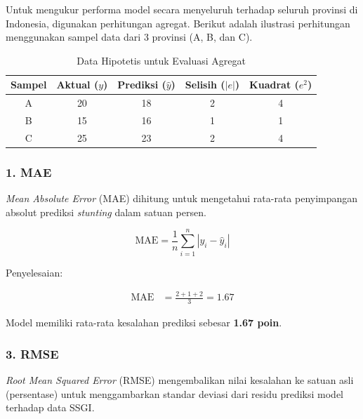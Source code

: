 Untuk mengukur performa model secara menyeluruh terhadap seluruh provinsi di Indonesia, digunakan perhitungan agregat. Berikut adalah ilustrasi perhitungan menggunakan sampel data dari 3 provinsi (A, B, dan C).

\begin{table}[H]
    \centering
    \renewcommand{\arraystretch}{1.3}
    \caption{Data Hipotetis untuk Evaluasi Agregat}
    \label{tab:eval_metrics_dummy}
    \begin{tabular}{ccccc}
    \toprule
    \textbf{Sampel} & \textbf{Aktual ($y$)} & \textbf{Prediksi ($\hat{y}$)} & \textbf{Selisih ($|e|$)} & \textbf{Kuadrat ($e^2$)} \\
    \midrule
    A & 20 & 18 & 2 & 4 \\
    B & 15 & 16 & 1 & 1 \\
    C & 25 & 23 & 2 & 4 \\
    \bottomrule
    \end{tabular}
\end{table}

\subsubsection*{1. MAE}
\textit{Mean Absolute Error} (MAE) dihitung untuk mengetahui rata-rata penyimpangan absolut prediksi \textit{stunting} dalam satuan persen.

\par\vspace{0.5cm}
\[
   \text{MAE} = \frac{1}{n} \sum_{i=1}^{n} |y_i - \hat{y}_i|
\]
\par\vspace{0.5cm}

\noindent Penyelesaian:
\par\vspace{0.2cm}
\begin{align*}
    \text{MAE} &= \frac{2 + 1 + 2}{3} = \mathbf{1.67}
\end{align*}
\par\vspace{0.5cm}

Model memiliki rata-rata kesalahan prediksi sebesar \textbf{1.67 poin}.

\subsubsection*{3. RMSE}
\textit{Root Mean Squared Error} (RMSE) mengembalikan nilai kesalahan ke satuan asli (persentase) untuk menggambarkan standar deviasi dari residu prediksi model terhadap data SSGI.

